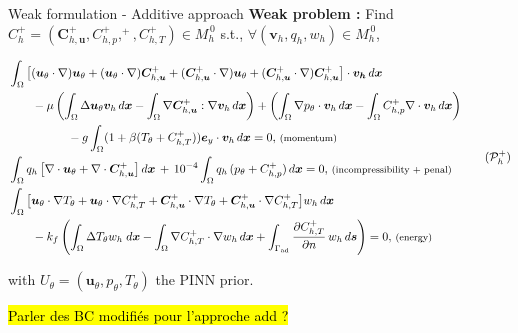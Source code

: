 \begin{frame}{Weak formulation - Additive approach}
    \textbf{Weak problem :} Find $C_h^+=(\bm{C}_{h,\bm{u}}^+, C_{h,p}^+,^+, C_{h,T}^+) \in M_h^{\, 0}$ s.t., \; $\forall (\bm{v}_h, q_h, w_h) \in M_h^{\, 0}$,

    \vspace{-4pt}
    \footnotesize
    \begin{equation}
        \label{eq:weak_pb_add}
        \hspace{-2pt}\begin{aligned}
            &\int_\Omega \big[(\bm{u}_\theta \cdot \nabla)\bm{u}_\theta + (\bm{u}_\theta \cdot \nabla)\bm{C}_{h,\bm{u}}^+ + (\bm{C}_{h,\bm{u}}^+ \cdot \nabla)\bm{u}_\theta + (\bm{C}_{h,\bm{u}}^+ \cdot \nabla)\bm{C}_{h,\bm{u}}^+ \big] \cdot \bm{v_h} \, d\bm{x} \\
            &\hspace{20pt} -\mu \left(\int_\Omega  \Delta \bm{u}_\theta \bm{v}_h \, d\bm{x} - \int_\Omega \nabla \bm{C}_{h,\bm{u}}^+ : \nabla \bm{v}_h \, d\bm{x}\right) + \left(\int_\Omega \nabla p_\theta \cdot \bm{v}_h \, d\bm{x} - \int_\Omega C_{h,p}^+ \nabla \cdot \bm{v}_h \, d\bm{x}\right)\\
            &\hspace{50pt} - g \int_\Omega (1 + \beta (T_\theta + C_{h,T}^+)) \bm{e}_y \cdot \bm{v}_h \, d\bm{x} = 0, \,\text{\footnotesize (momentum)}  \\
            &\int_\Omega q_h \, \big[\nabla \cdot \bm{u}_\theta + \nabla \cdot \bm{C}_{h,\bm{u}}^+\big] \, d\bm{x} \, + \, 10^{-4} \int_\Omega q_h \, (p_\theta + C_{h,p}^+) \, d\bm{x} = 0, \,\text{\footnotesize (incompressibility + penal)} \\
            & \int_\Omega \big[ \bm{u}_\theta \cdot \nabla T_\theta + \bm{u}_\theta \cdot \nabla C_{h,T}^+ + \bm{C}_{h,\bm{u}}^+ \cdot \nabla T_\theta + \bm{C}_{h,\bm{u}}^+ \cdot \nabla C_{h,T}^+ \big] w_h \, d\bm{x} \\
            & \hspace{20pt} - k_f \left(\int_\Omega \Delta T_\theta w_h \; d\bm{x}- \int_\Omega \nabla C_{h,T}^+ \cdot \nabla w_h \, d\bm{x} + \int_{\Gamma_\text{ad}} \frac{\partial C_{h,T}^+}{\partial n} \, w_h \, d\bm{s}\right) = 0, \,\text{\footnotesize (energy)}
        \end{aligned}
        \tag{$\mathcal{P}_h^+$}
    \end{equation}

    \vspace{5pt}
    with $U_\theta = (\bm{u}_\theta, p_\theta, T_\theta)$ the PINN prior.

    \hl{Parler des BC modifiés pour l'approche add ?}
\end{frame}

